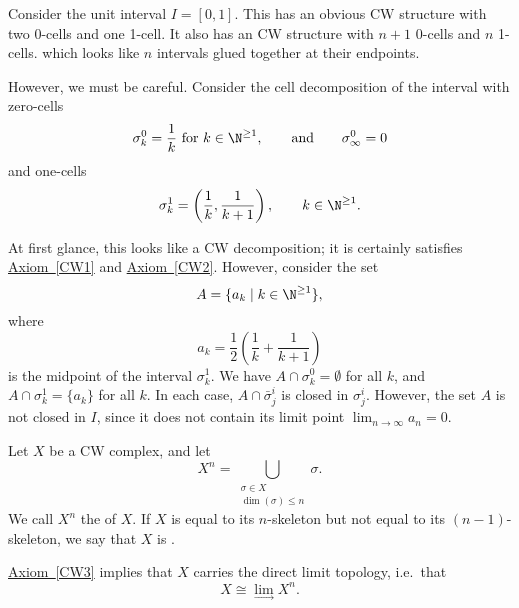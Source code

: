 \documentclass[main.tex]{subfiles}
\begin{document}
\begin{example}
  Consider the unit interval $I = [0, 1]$. This has an obvious CW structure with two 0-cells and one 1-cell. It also has an CW structure with $n+1$ 0-cells and $n$ 1-cells. which looks like $n$ intervals glued together at their endpoints.

  However, we must be careful. Consider the cell decomposition of the interval with zero-cells
  \begin{equation*}
    \sigma^{0}_{k} = \frac{1}{k}\text{ for } k \in \N^{\geq 1},\qquad \text{and}\qquad \sigma^{0}_{\infty} = 0
  \end{equation*}
  and one-cells
  \begin{equation*}
    \sigma^{1}_{k} = \left( \frac{1}{k}, \frac{1}{k+1} \right),\qquad k \in \N^{\geq 1}.
  \end{equation*}

  At first glance, this looks like a CW decomposition; it is certainly satisfies \hyperref[CW1]{Axiom~\ref*{CW1}} and \hyperref[CW2]{Axiom~\ref*{CW2}}. However, consider the set
  \begin{equation*}
    A = \{a_{k}\mid k \in \N^{\geq 1} \},
  \end{equation*}
  where
  \begin{equation*}
    a_{k} = \frac{1}{2}\left( \frac{1}{k} + \frac{1}{k+1} \right)
  \end{equation*}
  is the midpoint of the interval $\sigma^{1}_{k}$. We have $A \cap \sigma^{0}_{k} = \emptyset$ for all $k$, and $A \cap \sigma^{1}_{k} = \{a_{k}\}$ for all $k$. In each case, $A \cap \bar{\sigma}^{i}_{j}$ is closed in $\sigma^{i}_{j}$. However, the set $A$ is not closed in $I$, since it does not contain its limit point $\lim_{n \to \infty} a_{n} = 0$.
\end{example}

\begin{definition}
  \label{def:skeleton}
  Let $X$ be a CW complex, and let
  \begin{equation*}
    X^{n} = \bigcup_{\substack{\sigma \in X \\ \dim(\sigma) \leq n}} \sigma.
  \end{equation*}
  We call $X^{n}$ the  of $X$. If $X$ is equal to its $n$-skeleton but not equal to its $(n-1)$-skeleton, we say that $X$ is .
\end{definition}

\begin{note}
  \hyperref[CW3]{Axiom~\ref*{CW3}} implies that $X$ carries the direct limit topology, i.e.\ that
  \begin{equation*}
    X \cong \lim_{\rightarrow} X^{n}.
  \end{equation*}
\end{note}
\end{document}
